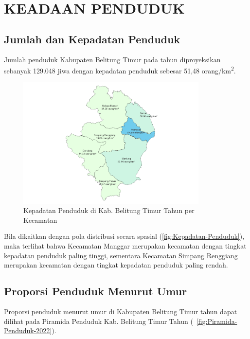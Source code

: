 \section{KEADAAN PENDUDUK}
\subsection{Jumlah dan Kepadatan Penduduk}
Jumlah penduduk Kabupaten Belitung Timur pada tahun \tP diproyeksikan sebanyak
129.048 jiwa dengan kepadatan penduduk sebesar 51,48 orang/km\textsuperscript{2}.

\begin{figure}[H]
	\centering
	\includegraphics[width=0.85\textwidth]{bab_01/bab_01_01_kepadatanPenduduk}
	\caption{Kepadatan Penduduk di Kab. Belitung Timur Tahun \tP per Kecamatan}
	\label{fig:Kepadatan-Penduduk}
\end{figure}

Bila dikaitkan dengan pola distribusi secara spasial (\autoref{fig:Kepadatan-Penduduk}), maka terlihat
bahwa Kecamatan Manggar merupakan kecamatan dengan tingkat kepadatan
penduduk paling tinggi, sementara Kecamatan Simpang Renggiang merupakan
kecamatan dengan tingkat kepadatan penduduk paling rendah.

\subsection{Proporsi Penduduk Menurut Umur}
Proporsi penduduk menurut umur di Kabupaten Belitung Timur tahun
\tP dapat dilihat pada Piramida Penduduk Kab. Belitung Timur Tahun \tP (~\autoref{fig:Piramida-Penduduk-2022}).

